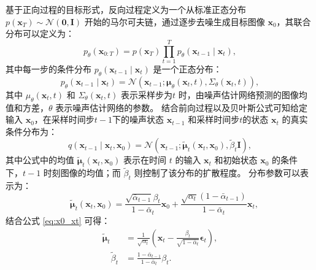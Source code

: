基于正向过程的目标形式，反向过程定义为一个从标准正态分布 $p\left(\mathbf{x}_T\right) \sim \mathcal{N}(\mathbf{0}, \mathbf{I})$ 开始的马尔可夫链，通过逐步去噪生成目标图像 $\mathbf{x}_0$，其联合分布可以定义为：
\begin{equation}
\label{eq:p_total}
    p_\theta\left(\mathbf{x}_{0: T}\right) =p\left(\mathbf{x}_T\right) \prod_{t=1}^T p_\theta\left(\mathbf{x}_{t-1} \mid \mathbf{x}_t\right),
\end{equation}
其中每一步的条件分布 $p_\theta(\mathbf{x}_{t-1} \mid \mathbf{x}_t)$ 是一个正态分布：
\begin{equation}
\label{eq:p}
    p_\theta\left(\mathbf{x}_{t-1} \mid \mathbf{x}_t\right) =\mathcal{N}\left(\mathbf{x}_{t-1} ; \boldsymbol{\mu}_\theta\left(\mathbf{x}_t, t\right), \Sigma_\theta\left(\mathbf{x}_t, t\right)\right) ,
\end{equation}
其中 $\mu_\theta\left(\mathbf{x}_t, t\right)$ 和 $\Sigma_\theta\left(\mathbf{x}_t, t\right)$ 表示采样步为$t$ 时，由噪声估计网络预测的图像均值和方差，$\theta$ 表示噪声估计网络的参数。
结合前向过程以及贝叶斯公式可知给定输入 $\mathbf{x}_0$，在采样时间步$t-1$下的噪声状态 $\mathbf{x}_{t-1}$ 和采样时间步$t$的状态 $\mathbf{x}_t$ 的真实条件分布为：
\begin{equation}
    \label{eq:real_q}
    q\left(\mathbf{x}_{t-1} \mid \mathbf{x}_t, \mathbf{x}_0\right)=\mathcal{N}\left(\mathbf{x}_{t-1} ; \tilde{\boldsymbol{\mu}}_t\left(\mathbf{x}_t, \mathbf{x}_0\right), \tilde{\beta}_t \mathbf{I}\right) ,
\end{equation}
其中公式中的均值 $\tilde{\boldsymbol{\mu}}_t(\mathbf{x}_t, \mathbf{x}_0)$ 表示在时间 $t$ 的输入 $\mathbf{x}_t$ 和初始状态 $\mathbf{x}_0$ 的条件下，$t-1$ 时刻图像的均值；而 $\tilde{\beta}_t$ 则控制了该分布的扩散程度。
分布参数可以表示为：
\begin{equation}
    \quad\tilde{\boldsymbol{\mu}}_t\left(\mathbf{x}_t, \mathbf{x}_0\right)=\frac{\sqrt{\bar{\alpha}_{t-1}} \beta_t}{1-\bar{\alpha}_t} \mathbf{x}_0+\frac{\sqrt{\alpha_t}\left(1-\bar{\alpha}_{t-1}\right)}{1-\bar{\alpha}_t} \mathbf{x}_t,
\end{equation}
结合公式 \eqref{eq:x0_xt} 可得：
\begin{align}
    \tilde{\boldsymbol{\mu}}_t &=\frac{1}{\sqrt{\alpha_t}}\left(\mathbf{x}_t-\frac{\beta_t}{\sqrt{1-\bar{\alpha}_t}} \boldsymbol{\epsilon}_t\right),\\
    \quad \tilde{\beta}_t &=\frac{1-\bar{\alpha}_{t-1}}{1-\bar{\alpha}_t} \beta_t.
\end{align}

